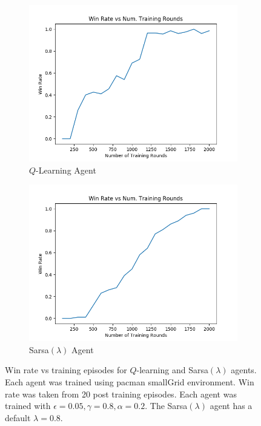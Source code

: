 \documentclass[10pt,conference]{IEEEtran}
\begin{document}
	\begin{figure}[h]
		\centering
		\begin{subfigure}{0.40\textwidth}
			\includegraphics[width=\textwidth]{./images/qlearning_winrate}
			\caption{\(Q\)-Learning Agent}
		\end{subfigure}%
		\begin{subfigure}{0.40\textwidth}
			\includegraphics[width=\textwidth]{./images/sarsa_winrate}
			\caption{Sarsa\((\lambda)\) Agent}
		\end{subfigure}
		\caption{Win rate vs training episodes for \(Q\)-learning and
		Sarsa\((\lambda)\) agents.  Each agent was trained using 
		pacman smallGrid environment.  Win rate was taken from 
		20 post training episodes. Each agent was trained with 
		\(\epsilon = 0.05, \gamma = 0.8, \alpha = 0.2\).  The 
		Sarsa\((\lambda)\) agent has a default \(\lambda = 0.8\).}
		\label{winrate}
	\end{figure}
\end{document}
